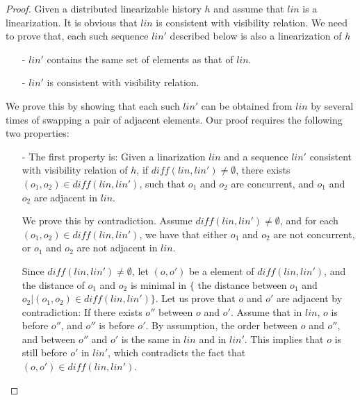 {\begin {proof}
Given a distributed linearizable history $h$ and assume that $\mathit{lin}$ is a linearization. It is obvious that $\mathit{lin}$ is consistent with visibility relation. We need to prove that, each such sequence $\mathit{lin}'$ described below is also a linearization of $h$

\begin{itemize}
\setlength{\itemsep}{0.5pt}
\item[-] $\mathit{lin}'$ contains the same set of elements as that of $\mathit{lin}$.

\item[-] $\mathit{lin}'$ is consistent with visibility relation.
\end{itemize}

We prove this by showing that each such $\mathit{lin}'$ can be obtained from $\mathit{lin}$ by several times of swapping a pair of adjacent elements. Our proof requires the following two properties:

\begin{itemize}
\setlength{\itemsep}{0.5pt}
\item[-] The first property is: Given a linarization $\mathit{lin}$ and a sequence $\mathit{lin}'$ consistent with visibility relation of $h$, if $\mathit{diff}(\mathit{lin},\mathit{lin}') \neq \emptyset$, there exists $(o_1,o_2) \in \mathit{diff}(\mathit{lin},\mathit{lin}')$, such that $o_1$ and $o_2$ are concurrent, and $o_1$ and $o_2$ are adjacent in $\mathit{lin}$.

    We prove this by contradiction. Assume $\mathit{diff}(\mathit{lin},\mathit{lin}') \neq \emptyset$, and for each $(o_1,o_2) \in \mathit{diff}(\mathit{lin},\mathit{lin}')$, we have that either $o_1$ and $o_2$ are not concurrent, or $o_1$ and $o_2$ are not adjacent in $\mathit{lin}$.

    Since $\mathit{diff}(\mathit{lin},\mathit{lin}') \neq \emptyset$, let $(o,o')$ be a element of $\mathit{diff}(\mathit{lin},\mathit{lin}')$, and the distance of $o_1$ and $o_2$ is minimal in $\{$ the distance between $o_1$ and $o_2 \vert (o_1,o_2) \in \mathit{diff}(\mathit{lin},\mathit{lin}') \}$. Let us prove that $o$ and $o'$ are adjacent by contradiction: If there exists $o''$ between $o$ and $o'$. Assume that in $\mathit{lin}$, $o$ is before $o''$, and $o''$ is before $o'$. By assumption, the order between $o$ and $o''$, and between $o''$ and $o'$ is the same in $\mathit{lin}$ and in $\mathit{lin}'$. This implies that $o$ is still before $o'$ in $\mathit{lin}'$, which contradicts the fact that $(o,o') \in \mathit{diff}(\mathit{lin},\mathit{lin}')$.


\end{itemize}
\end{proof}}
